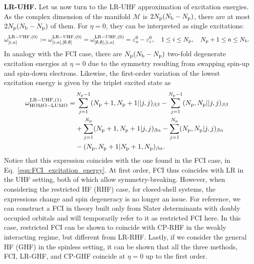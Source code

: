 \documentclass[11pt]{article}
\begin{document}
\medskip

\noindent\textbf{LR-UHF.} Let us now turn to the LR-UHF approximation of excitation energies. As the complex dimension of the manifold $\mathcal M$ is $2N_{\rm p}(N_{\rm b}-N_{\rm p})$, there are at most $2N_{\rm p}(N_{\rm b}-N_{\rm p})$ of them. For $\eta=0$, they can be interpreted as single excitations:
$$
\omega_{[i,a]}^{{\rm LR-UHF},(0)} :=\omega_{[i,a],[\emptyset,\emptyset]}^{{\rm LR-UHF},(0)} = \omega_{[\emptyset,\emptyset],[i,a]}^{{\rm LR-UHF},(0)} = \varepsilon_a^0-\varepsilon_i^0, \quad 1 \le i \le N_{\rm p}, \quad N_{\rm p}+1 \le a \le N_{\rm b}.
$$
In analogy with the FCI case, there are $N_{\rm p}(N_{\rm b}-N_{\rm p})$ two-fold degenerate excitation energies at $\eta=0$ due to the symmetry resulting from swapping spin-up and spin-down electrons. Likewise, the first-order variation of the lowest excitation energy is given by the triplet excited state as
\begin{align}
\omega_{\rm HOMO-LUMO}^{\rm LR-UHF,(1)}=&\sum_{j=1}^{N_{\rm p}-1}(N_{\rm p}+1,N_{\rm p}+1||j,j)_{\beta\beta}-\sum_{j=1}^{N_{\rm p}-1}(N_{\rm p},N_{\rm p}||j, j)_{\beta\beta}\nonumber\\
&+\sum_{j=1}^{N_{\rm p}}(N_{\rm p}+1,N_{\rm p}+1|j, j)_{\beta\alpha}-\sum_{j=1}^{N_{\rm p}}(N_{\rm p},N_{\rm p}|j, j)_{\beta\alpha}\nonumber\\
&-(N_{\rm p},N_{\rm p}+1|N_{\rm p}+1, N_{\rm p})_{\beta\alpha}.
\label{eqn:UHF LR excitation energy first order}
\end{align}
Notice that this expression coincides with the one found in the FCI case, in Eq.~\eqref{eqn:FCI_excitation_energy}. At first order, FCI thus coincides with LR in the UHF setting, both of which allow symmetry-breaking. However, when considering the restricted HF (RHF) case, for closed-shell systems, the expressions change and spin degeneracy is no longer an issue. For reference, we can construct a FCI in theory built only from Slater determinants with doubly occupied orbitals and will temporarily refer to it as restricted FCI here. In this case, restricted FCI can be shown to coincide with CP-RHF in the weakly interacting regime, but different from LR-RHF. Lastly, if we consider the general HF (GHF) in the spinless setting, it can be shown that all the three methods, FCI, LR-GHF, and CP-GHF coincide at $\eta=0$ up to the first order.
\end{document}
